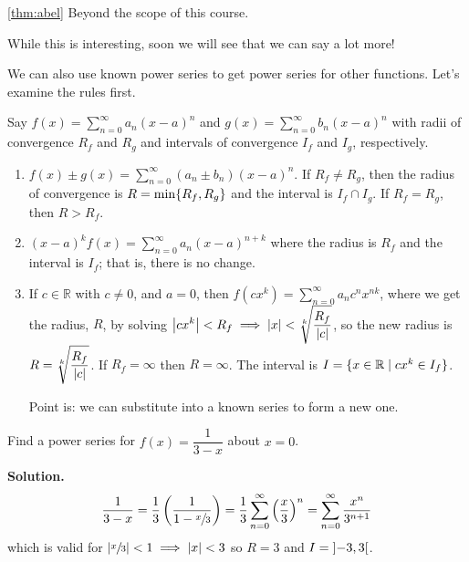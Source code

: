 \begin{Proof}{\ref{thm:abel}}{}
    Beyond the scope of this course.
\end{Proof}

While this is interesting, soon we will see that we can say a lot more!

We can also use known power series to get power series for other functions. Let's
examine the rules first.

Say $ f(x)=\sum\limits_{n=0}^{\infty} a_n(x-a)^n $ and $ g(x)=\sum\limits_{n=0}^{\infty} b_n(x-a)^n $
with radii of convergence $ R_f $ and $ R_g $ and intervals of convergence
$ I_f $ and $ I_g $, respectively.

\begin{enumerate}[label=(\Roman*)]
    \item $ f(x)\pm g(x)=\sum\limits_{n=0}^{\infty} (a_n\pm b_n)(x-a)^n $. If $ R_f\neq R_g $,
          then the radius of convergence is $ R=\min\set{R_f,R_g} $
          and the interval is $ I_f\cap I_g $. If $ R_f=R_g $, then $ R>R_f $.
    \item $ (x-a)^k f(x)=\sum\limits_{n=0}^{\infty} a_n(x-a)^{n+k} $ where the radius
          is $ R_f $ and the interval is $ I_f $; that is, there is no change.
    \item If $ c\in\mathbb{R} $ with $ c\neq 0 $, and $ a=0 $,
          then $ f(cx^k)=\sum\limits_{n=0}^{\infty} a_n c^n x^{nk} $, where we get the radius,
          $ R $, by solving $
              \displaystyle \abs*{cx^k}<R_f\implies \abs{x}<\sqrt[k]{\frac{R_f}{\abs{c}}} $,
          so the new radius is
          $ \displaystyle R=\sqrt[k]{\dfrac{R_f}{\abs{c}}} $. If $ R_f=\infty $
          then $ R=\infty $. The interval is $ I=\set{x\in\mathbb{R}\mid cx^k\in I_f} $.

          Point is: we can substitute into a known series to form a new one.
\end{enumerate}

\begin{Example}{}{}
    Find a power series for $ f(x)=\dfrac{1}{3-x} $ about $ x=0 $.

    \textbf{Solution.}
    \[ \frac{1}{3-x}
        =\frac{1}{3} \left( \frac{1}{1-\sfrac{x}{3}}  \right)
        =\frac{1}{3}\sum\limits_{n=0}^{\infty} \left( \frac{x}{3} \right)^n
        =\sum\limits_{n=0}^{\infty} \frac{x^n}{3^{n+1}}  \]
    which is valid for $ \abs*{\sfrac{x}{3}}<1\implies \abs{x}<3 $ so $ R=3 $
    and $ I=\interval[open]{-3}{3} $.
\end{Example}

